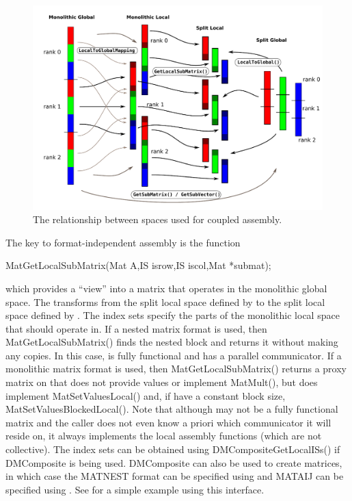 \begin{figure}
\centerline{\includegraphics[width=\textwidth]{localspaces}}
\caption{The relationship between spaces used for coupled assembly.}
\label{fig_localspaces}
\end{figure}

The key to format-independent assembly is the function
\begin{tabbing}
  MatGetLocalSubMatrix(Mat A,IS isrow,IS iscol,Mat *submat);
\end{tabbing}
which provides a ``view''  into a matrix  that operates in the monolithic global space.
The  transforms from the split local space defined by  to the split local space defined by .
The index sets specify the parts of the monolithic local space that  should operate in.
If a nested matrix format is used, then MatGetLocalSubMatrix() finds the nested block and returns it without making any copies.
In this case,  is fully functional and has a parallel communicator.
If a monolithic matrix format is used, then MatGetLocalSubMatrix() returns a proxy matrix on  that does not provide values or implement MatMult(), but does implement MatSetValuesLocal() and, if  have a constant block size, MatSetValuesBlockedLocal().
Note that although  may not be a fully functional matrix and the caller does not even know a priori which communicator it will reside on, it always implements the local assembly functions (which are not collective).
The index sets  can be obtained using DMCompositeGetLocalISs() if DMComposite is being used.
DMComposite can also be used to create matrices, in which case the MATNEST format can be specified using  and MATAIJ can be specified using .
See  for a simple example using this interface.

